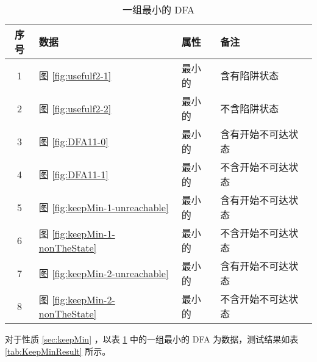 \begin{table}[!htbp]
    \caption{一组最小的 DFA}
    \label{tab:KeepMinData}
    \centering
    \small%
    \setlength{\tabcolsep}{4pt}%
    \renewcommand{\arraystretch}{1.2}%
    \begin{tabular}{c p{4em}<{\centering} p{4em}<{\centering} l}  %
        \toprule %
                序号  &  数据 & 属性 & 备注 \\
        \midrule%
        1 &  图 \ref{fig:usefulf2-1} & 最小的 & 含有陷阱状态 \\
        2 &  图 \ref{fig:usefulf2-2} & 最小的 & 不含陷阱状态 \\
        \midrule
        3 & 图 \ref{fig:DFA11-0} & 最小的 & 含有开始不可达状态 \\
        4 & 图 \ref{fig:DFA11-1} & 最小的 & 不含开始不可达状态 \\
       \midrule
        5 & 图 \ref{fig:keepMin-1-unreachable} & 最小的 & 含有开始不可达状态 \\
        6 & 图 \ref{fig:keepMin-1-nonTheState} & 最小的 & 不含开始不可达状态 \\
       \midrule
        7 & 图 \ref{fig:keepMin-2-unreachable} & 最小的 & 含有开始不可达状态 \\
        8 & 图 \ref{fig:keepMin-2-nonTheState} & 最小的 & 不含开始不可达状态 \\
        \bottomrule%
    \end{tabular}
\end{table}


对于性质 \ref{sec:keepMin} ，以表 \ref{tab:KeepMinData} 中的一组最小的 DFA 为数据，测试结果如表 \ref{tab:KeepMinResult} 所示。




